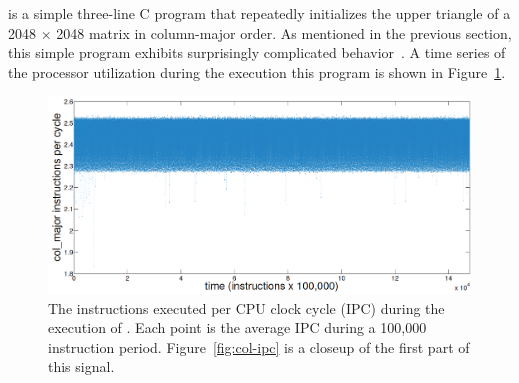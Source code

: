 


\col is a simple three-line C program that repeatedly initializes the
upper triangle of a 2048 $\times$ 2048 matrix in column-major order.
As mentioned in the previous section, this simple program exhibits
surprisingly complicated behavior~\cite{mytkowicz09}.  A time series
of the processor utilization during the execution this program is
shown in Figure~\ref{fig:col-ts}.
\begin{figure}[htbp]
  \centering
    \includegraphics[width=\columnwidth]{figs/colFullTS}
    \caption{The instructions executed per CPU clock cycle (IPC)
      during the execution of \col.  Each point is the average IPC
      during a 100,000 instruction period. Figure~\ref{fig:col-ipc} is
      a closeup of the first part of this signal.  }
    \label{fig:col-ts}
  
  \end{figure}

